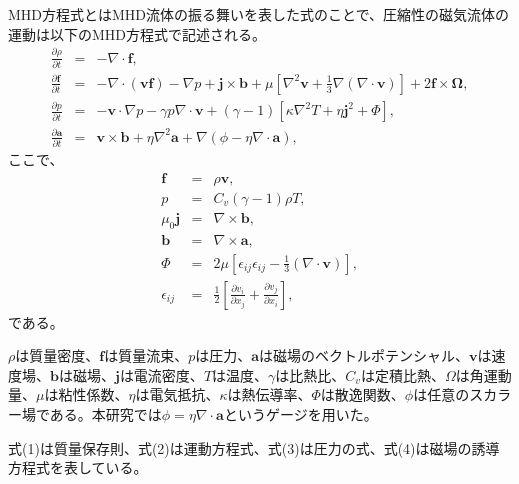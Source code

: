 \documentclass[12pt]{jsarticle}
\begin{document}
MHD方程式とはMHD流体の振る舞いを表した式のことで、圧縮性の磁気流体の運動は以下のMHD方程式で記述される\cite{宇宙流体力学}。
\begin{eqnarray}
\frac{\partial \rho}{\partial t}&=&-\nabla \cdot \bm{f} , \\
\frac{\partial \bm{f}}{\partial t}&=&-\nabla \cdot (\bm{v}\bm{f})-\nabla p+\bm{j}\times\bm{b}+\mu\left[\nabla^2\bm{v}+\frac{1}{3}\nabla(\nabla\cdot\bm{v})\right]+2\bm{f}\times\bm{\Omega}, \\
\frac{\partial p}{\partial t}&=&-\bm{v}\cdot\nabla p - \gamma p \nabla\cdot \bm{v} + (\gamma-1)\left[\kappa\nabla^2 T +\eta\bm{j}^2 + \Phi\right], \\
\frac{\partial \bm{a}}{\partial t}&=&\bm{v}\times\bm{b}+\eta\nabla^2\bm{a} +\nabla(\phi-\eta\nabla\cdot\bm{a}), 
\end{eqnarray}
ここで、
\begin{eqnarray}
\bm{f}&=&\rho\bm{v},\\
p&=&C_v(\gamma-1)\rho T,\\
\mu_0\bm{j}&=&\nabla\times\bm{b},\\
\bm{b}&=&\nabla\times\bm{a},\\
\Phi&=&2\mu\left[\epsilon_{ij}\epsilon_{ij}-\frac{1}{3}(\nabla\cdot\bm{v})\right],\\
\epsilon_{ij}&=&\frac{1}{2}\left[\frac{\partial v_i}{\partial x_j} + \frac{\partial v_j}{\partial x_i}\right],
\end{eqnarray}
である。

$\rho$は質量密度、$\bm{f}$は質量流束、$p$は圧力、$\bm{a}$は磁場のベクトルポテンシャル、$\bm{v}$は速度場、$\bm{b}$は磁場、$\bm{j}$は電流密度、$T$は温度、$\gamma$は比熱比、$C_v$は定積比熱、$\Omega$は角運動量、$\mu$は粘性係数、$\eta$は電気抵抗、$\kappa$は熱伝導率、$\Phi$は散逸関数、$\phi$は任意のスカラー場である。本研究では$\phi=\eta\nabla\cdot\bm{a}$というゲージを用いた。

式(1)は質量保存則、式(2)は運動方程式、式(3)は圧力の式、式(4)は磁場の誘導方程式を表している。


\end{document}
